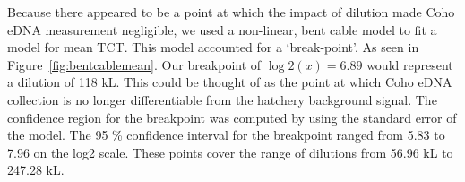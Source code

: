 Because there appeared to be a point at which the impact of dilution made Coho eDNA measurement negligible, we used a non-linear, bent cable model to fit a model for mean TCT. This model accounted for a  `break-point'. As seen in Figure~\ref{fig:bentcablemean}. Our breakpoint of $\log2(x)=6.89$ would represent a dilution of 118 kL. This could be thought of as the point at which Coho eDNA collection is no longer differentiable from the hatchery background signal. The confidence region for the breakpoint was computed by using the standard error of the model. The 95 \% confidence interval for the breakpoint ranged from 5.83 to 7.96 on the log2 scale. These points cover the range of dilutions from 56.96 kL to 247.28 kL. 